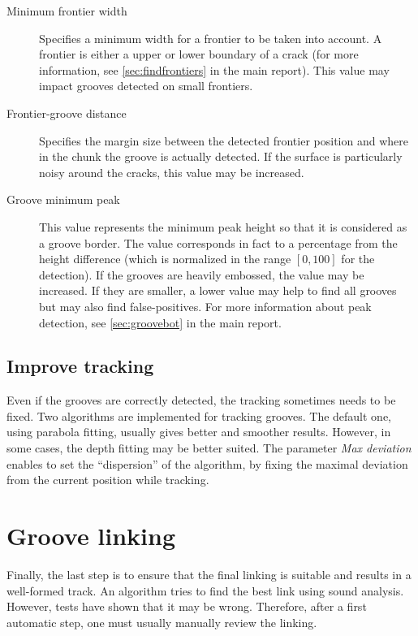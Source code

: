 \begin{description}
\item[Minimum frontier width] Specifies a minimum width for a frontier to be taken into account. A frontier is either a upper or lower boundary of a crack (for more information, see \autoref{sec:findfrontiers} in the main report). This value may impact grooves detected on small frontiers.
\item[Frontier-groove distance] Specifies the margin size between the detected frontier position and where in the chunk the groove is actually detected. If the surface is particularly noisy around the cracks, this value may be increased.
\item[Groove minimum peak] This value represents the minimum peak height so that it is considered as a groove border. The value corresponds in fact to a percentage from the height difference (which is normalized in the range $[0,100]$ for the detection). If the grooves are heavily embossed, the value may be increased. If they are smaller, a lower value may help to find all grooves but may also find false-positives. For more information about peak detection, see \autoref{sec:groovebot} in the main report.
\end{description}

\subsection{Improve tracking}

Even if the grooves are correctly detected, the tracking sometimes needs to be fixed. Two algorithms are implemented for tracking grooves. The default one, using parabola fitting, usually gives better and smoother results. However, in some cases, the depth fitting may be better suited. The parameter \emph{Max deviation} enables to set the ``dispersion'' of the algorithm, by fixing the maximal deviation from the current position while tracking.

\section{Groove linking}

Finally, the last step is to ensure that the final linking is suitable and results in a well-formed track. An algorithm tries to find the best link using sound analysis. However, tests have shown that it may be wrong. Therefore, after a first automatic step, one must usually manually review the linking.

